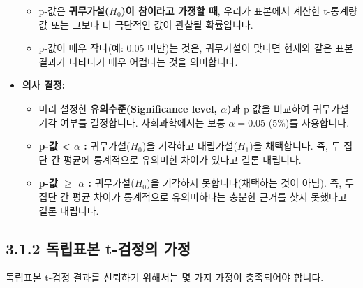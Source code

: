 \documentclass[
  letterpaper,
]{book}
\providecommand{\tightlist}{%
  \setlength{\itemsep}{0pt}\setlength{\parskip}{0pt}}
\begin{document}
\begin{itemize}
  \begin{itemize}
  \tightlist
  \item
    p-값은 \textbf{귀무가설(\(H_0\))이 참이라고 가정할 때}, 우리가
    표본에서 계산한 t-통계량 값 또는 그보다 더 극단적인 값이 관찰될
    확률입니다.
  \item
    p-값이 매우 작다(예: 0.05 미만)는 것은, 귀무가설이 맞다면 현재와
    같은 표본 결과가 나타나기 매우 어렵다는 것을 의미합니다.
  \end{itemize}
\item
  \textbf{의사 결정:}

  \begin{itemize}
  \tightlist
  \item
    미리 설정한 \textbf{유의수준(Significance level, \(\alpha\))}과
    p-값을 비교하여 귀무가설 기각 여부를 결정합니다. 사회과학에서는 보통
    \(\alpha = 0.05\) (5\%)를 사용합니다.
  \item
    \textbf{p-값 \textless{} \(\alpha\) :} 귀무가설(\(H_0\))을 기각하고
    대립가설(\(H_1\))을 채택합니다. 즉, 두 집단 간 평균에 통계적으로
    유의미한 차이가 있다고 결론 내립니다.
  \item
    \textbf{p-값 \(\ge\) \(\alpha\) :} 귀무가설(\(H_0\))을 기각하지
    못합니다(채택하는 것이 아님). 즉, 두 집단 간 평균 차이가 통계적으로
    유의미하다는 충분한 근거를 찾지 못했다고 결론 내립니다.
  \end{itemize}
\end{itemize}

\subsection{3.1.2 독립표본 t-검정의
가정}\label{uxb3c5uxb9bduxd45cuxbcf8-t-uxac80uxc815uxc758-uxac00uxc815}

독립표본 t-검정 결과를 신뢰하기 위해서는 몇 가지 가정이 충족되어야
합니다.
\end{document}
